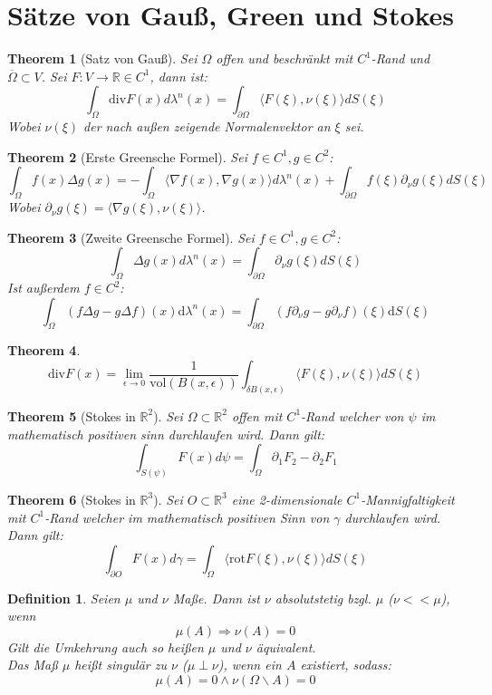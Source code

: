 \documentclass[10pt,a4paper]{article}
\newtheorem{theorem}{Theorem}
\newtheorem{definition}{Definition}
\begin{document}
\section{Sätze von Gauß, Green und Stokes}
\begin{theorem}[Satz von Gauß]
	Sei $\Omega$ offen und beschränkt mit $C^1$-Rand und $\overline{\Omega} \subset V$. Sei $F:V \to \mathbb{R}\in C^1$, dann ist:
	$$\int_\Omega \text{div} F(x)d\lambda^n(x) = \int_{\partial\Omega}\langle F(\xi), \nu(\xi)\rangle dS(\xi)$$
	Wobei $\nu(\xi)$ der nach außen zeigende Normalenvektor an $\xi$ sei.
\end{theorem}
\begin{theorem}[Erste Greensche Formel]
	Sei $f\in C^1, g\in C^2$:
	$$\int_{\Omega}f(x)\Delta g(x)= -\int_\Omega \langle\nabla f(x), \nabla g(x)\rangle d\lambda^n(x) + \int_{\partial\Omega}f(\xi)\partial_\nu g(\xi)dS(\xi)$$
	Wobei $\partial_\nu g(\xi) = \langle \nabla g(\xi), \nu(\xi)\rangle$.
\end{theorem}
\begin{theorem}[Zweite Greensche Formel]
	Sei $f\in C^1, g\in C^2$:
	$$\int_{\Omega}\Delta g(x) d\lambda^n(x) = \int_{\partial\Omega}\partial_\nu g(\xi)dS(\xi)$$
	Ist außerdem $f\in C^2$:
	$$\int_{\Omega}(f \Delta g-g \Delta f)(x) \mathrm{d} \lambda^n(x)=\int_{\partial \Omega}\left(f \partial_\nu g-g \partial_\nu f\right)(\xi) \mathrm{d} S(\xi)$$
\end{theorem}
\begin{theorem}
	$$\text{div} F(x) = \lim_{\epsilon \to 0}\frac{1}{\text{vol}(B(x, \epsilon))}\int_{\delta B(x,\epsilon)} \langle F(\xi), \nu(\xi)\rangle dS(\xi)$$
\end{theorem}
\begin{theorem}[Stokes in $\mathbb{R}^2$]
	Sei $\Omega \subset \mathbb{R}^2$ offen mit $C^1$-Rand welcher von $\psi$ im mathematisch positiven sinn durchlaufen wird. Dann gilt:
	$$\int_{S(\psi)} F(x) d\psi = \int_\Omega \partial_1 F_2 -\partial_2F_1$$
\end{theorem}
\begin{theorem}[Stokes in $\mathbb{R}^3$]
	Sei $O \subset \mathbb{R}^3$  eine 2-dimensionale $C^1$-Mannigfaltigkeit mit $C^1$-Rand welcher im mathematisch positiven Sinn von $\gamma$ durchlaufen wird. Dann gilt:
	$$\int_{\partial O} F(x) d\gamma = \int_\Omega \langle \text{rot}F(\xi), \nu(\xi)\rangle dS(\xi)$$
\end{theorem}
\begin{definition}
	Seien $\mu$ und $\nu$ Maße. 
	Dann ist $\nu$ absolutstetig bzgl. $\mu$ ($\nu << \mu$), wenn $$\mu(A)  \Rightarrow \nu(A)= 0$$
	Gilt die Umkehrung auch so heißen $\mu$ und $\nu$ äquivalent.\\
	Das Maß $\mu$ heißt singulär zu $\nu$ ($\mu \perp \nu$), wenn ein $A$ existiert, sodass:
	$$\mu(A) = 0 \land \nu(\Omega\backslash A) = 0$$
\end{definition}
\end{document}
